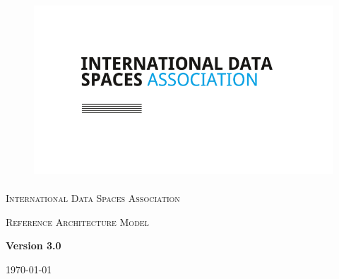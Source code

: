 \documentclass[12pt]{article}
\renewcommand{\_}{\kern-1.5pt\textunderscore\kern-1.5pt}
\begin{document}
\begin{titlepage}

\begin{figure}[H]
\advance\leftskip 2.87in		\includegraphics[width=4.66in,height=2.62in]{./media/image1.png}
\end{figure}


	\centering


	{\scshape\Large International Data Spaces Association \par}
	\vspace{1cm}
	{\scshape\Large Reference Architecture Model\par}
	\vspace{1.5cm}
	{\huge\bfseries Version 3.0\par}
	\vspace{2cm}
	
	\vfill

	{\large \today\par}
\end{titlepage}




\newpage






\newpage




\newpage


\end{document}
